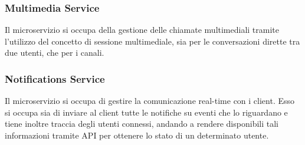 %
%
%
\subsubsection{Multimedia Service}

Il microservizio si occupa della gestione delle chiamate multimediali tramite l'utilizzo del concetto di sessione multimediale, sia per le conversazioni dirette tra due utenti, che per i canali.

%
%
%
\subsubsection{Notifications Service}

Il microservizio si occupa di gestire la comunicazione real-time con i client.
Esso si occupa sia di inviare al client tutte le notifiche su eventi che lo riguardano e tiene inoltre traccia degli utenti connessi, andando a rendere disponibili tali informazioni tramite API per ottenere lo stato di un determinato utente.

%
%
%


